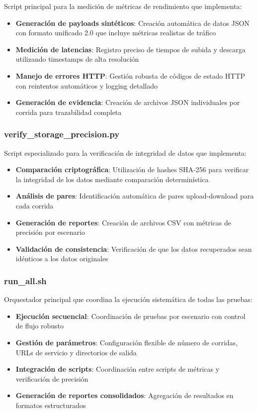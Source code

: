 \documentclass[onecolumn]{article}
\begin{document}
Script principal para la medición de métricas de rendimiento que implementa:

\begin{itemize}
    \item \textbf{Generación de payloads sintéticos}: Creación automática de datos JSON con formato unificado 2.0 que incluye métricas realistas de tráfico
    \item \textbf{Medición de latencias}: Registro preciso de tiempos de subida y descarga utilizando timestamps de alta resolución
    \item \textbf{Manejo de errores HTTP}: Gestión robusta de códigos de estado HTTP con reintentos automáticos y logging detallado
    \item \textbf{Generación de evidencia}: Creación de archivos JSON individuales por corrida para trazabilidad completa
\end{itemize}

\subsubsection{verify\_storage\_precision.py}

Script especializado para la verificación de integridad de datos que implementa:

\begin{itemize}
    \item \textbf{Comparación criptográfica}: Utilización de hashes SHA-256 para verificar la integridad de los datos mediante comparación determinística
    \item \textbf{Análisis de pares}: Identificación automática de pares upload-download para cada corrida
    \item \textbf{Generación de reportes}: Creación de archivos CSV con métricas de precisión por escenario
    \item \textbf{Validación de consistencia}: Verificación de que los datos recuperados sean idénticos a los datos originales
\end{itemize}

\subsubsection{run\_all.sh}

Orquestador principal que coordina la ejecución sistemática de todas las pruebas:

\begin{itemize}
    \item \textbf{Ejecución secuencial}: Coordinación de pruebas por escenario con control de flujo robusto
    \item \textbf{Gestión de parámetros}: Configuración flexible de número de corridas, URLs de servicio y directorios de salida
    \item \textbf{Integración de scripts}: Coordinación entre scripts de métricas y verificación de precisión
    \item \textbf{Generación de reportes consolidados}: Agregación de resultados en formatos estructurados
\end{itemize}
\end{document}
